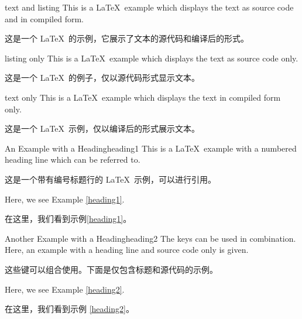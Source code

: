 \begin{dispExample}
\begin{texexp}{text and listing}
This is a \LaTeX\ example which displays the text as source code
and in compiled form.

这是一个 \LaTeX\ 的示例，它展示了文本的源代码和编译后的形式。
\end{texexp}
\end{dispExample}


\begin{dispExample}
\begin{texexp}{listing only}
This is a \LaTeX\ example which displays the text as source code only.

这是一个 \LaTeX\ 的例子，仅以源代码形式显示文本。
\end{texexp}
\end{dispExample}


\begin{dispExample}
\begin{texexp}{text only}
This is a \LaTeX\ example which displays the text in compiled form only.

这是一个 \LaTeX\ 示例，仅以编译后的形式展示文本。
\end{texexp}
\end{dispExample}


\begin{dispExample}
\begin{texexptitled}{An Example with a Heading}{heading1}
This is a \LaTeX\ example with a numbered heading line
which can be referred to.

这是一个带有编号标题行的 \LaTeX\ 示例，可以进行引用。
\end{texexptitled}
Here, we see Example \ref{heading1}.

在这里，我们看到示例\ref{heading1}。
\end{dispExample}


\begin{dispExample}
\begin{texexptitled}{Another Example with a Heading}{heading2}
The keys can be used in combination. Here, an example with a heading line
and source code only is given.

这些键可以组合使用。下面是仅包含标题和源代码的示例。
\end{texexptitled}
Here, we see Example \ref{heading2}.

在这里，我们看到示例 \ref{heading2}。
\end{dispExample}


